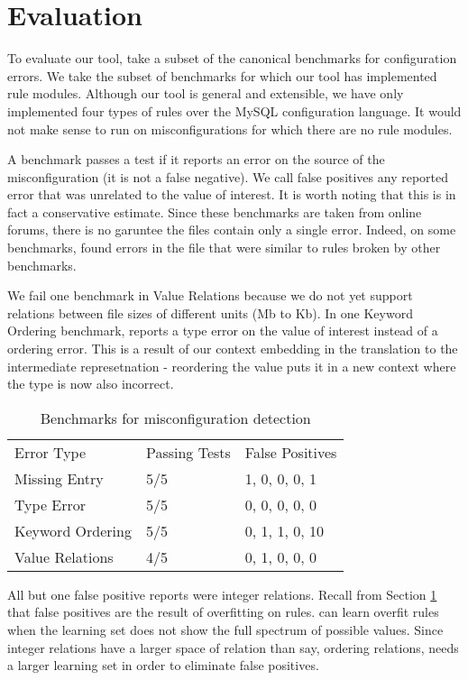 \section{Evaluation}

To evaluate our tool, take a subset of the canonical benchmarks for configuration errors\cite{dataset}.
We take the subset of benchmarks for which our tool has implemented rule modules.
Although our tool is general and extensible, we have only implemented four types of rules over the MySQL configuration language.
It would not make sense to run \app on misconfigurations for which there are no rule modules.

A benchmark passes a test if it reports an error on the source of the misconfiguration (it is not a false negative).
We call false positives any reported error that was unrelated to the value of interest.
It is worth noting that this is in fact a conservative estimate.
Since these benchmarks are taken from online forums, there is no garuntee the files contain only a single error.
Indeed, on some benchmarks, \app found errors in the file that were similar to rules broken by other benchmarks. 

We fail one benchmark in Value Relations because we do not yet support relations between file sizes of different units (Mb to Kb).
In one Keyword Ordering benchmark, \app reports a type error on the value of interest instead of a ordering error.
This is a result of our context embedding in the translation to the intermediate represetnation - reordering the value puts it in a new context where the type is now also incorrect.

\begin{table}[]
\centering
\caption{Benchmarks for misconfiguration detection}
\label{my-label}
\begin{tabular}{l|l|l}
Error Type       & Passing Tests & False Positives  \\ \hhline{|=|=|=|}
Missing Entry    & 5/5           & 1, 0, 0, 0, 1        \\ \hline
Type Error       & 5/5           & 0, 0, 0, 0, 0          \\ \hline
Keyword Ordering & 5/5           & 0, 1, 1, 0, 10       \\ \hline
Value Relations  & 4/5           & 0, 1, 0, 0, 0        \\ 
\end{tabular}
\end{table}

All but one false positive reports were integer relations.
Recall from Section \ref{} that false positives are the result of overfitting on rules.
\app can learn overfit rules when the learning set does not show the full spectrum of possible values.
Since integer relations have a larger space of relation than say, ordering relations, \app needs a larger learning set in order to eliminate false positives.

